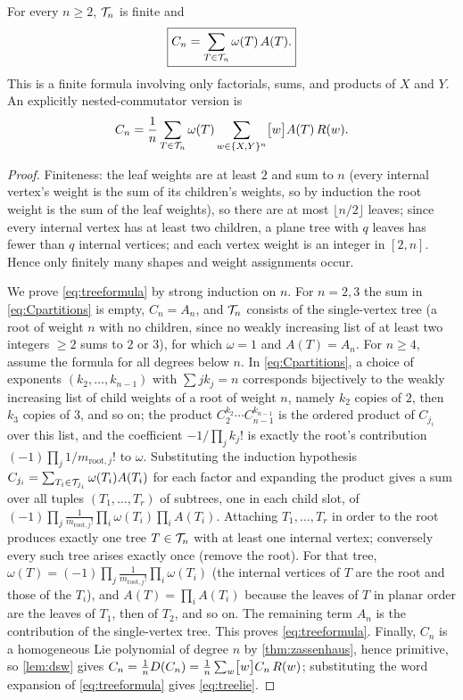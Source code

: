 \begin{theorem}\label{thm:tree}
For every $n\geq2$, $\mathcal{T}_n$ is finite and
\begin{equation}\label{eq:treeformula}
 \boxed{\displaystyle C_n=\sum_{T\in\mathcal{T}_n}\omega(T)\,A(T).}
\end{equation}
This is a finite formula involving only factorials, sums, and products of
$X$ and $Y$. An explicitly nested-commutator version is
\begin{equation}\label{eq:treelie}
 C_n=\frac1n\sum_{T\in\mathcal{T}_n}\omega(T)\sum_{w\in\{X,Y\}^n}\bigl[w\bigr]A(T)\,R(w).
\end{equation}
\end{theorem}
\begin{proof}
Finiteness: the leaf weights are at least $2$ and sum to $n$ (every
internal vertex's weight is the sum of its children's weights, so by
induction the root weight is the sum of the leaf weights), so there are at
most $\lfloor n/2\rfloor$ leaves; since every internal vertex has at least
two children, a plane tree with $q$ leaves has fewer than $q$ internal
vertices; and each vertex weight is an integer in $[2,n]$. Hence only
finitely many shapes and weight assignments occur.

We prove \eqref{eq:treeformula} by strong induction on $n$. For $n=2,3$
the sum in \eqref{eq:Cpartitions} is empty, $C_n=A_n$, and $\mathcal{T}_n$ consists
of the single-vertex tree (a root of weight $n$ with no children, since
no weakly increasing list of at least two integers $\geq2$ sums to $2$ or
$3$), for which $\omega=1$ and $A(T)=A_n$. For $n\geq4$, assume the formula
for all degrees below $n$. In \eqref{eq:Cpartitions}, a choice of exponents
$(k_2,\ldots,k_{n-1})$ with $\sum jk_j=n$ corresponds bijectively to the
weakly increasing list of child weights of a root of weight $n$, namely
$k_2$ copies of $2$, then $k_3$ copies of $3$, and so on; the product
$C_2^{k_2}\cdots C_{n-1}^{k_{n-1}}$ is the ordered product of $C_{j_i}$
over this list, and the coefficient $-1/\prod_jk_j!$ is exactly the root's
contribution $(-1)\prod_j1/m_{\mathrm{root},j}!$ to $\omega$. Substituting
the induction hypothesis $C_{j_i}=\sum_{T_i\in\mathcal{T}_{j_i}}\omega(T_i)A(T_i)$
for each factor and expanding the product gives a sum over all tuples
$(T_1,\ldots,T_r)$ of subtrees, one in each child slot, of
$(-1)\prod_j\frac1{m_{\mathrm{root},j}!}\prod_i\omega(T_i)\prod_iA(T_i)$.
Attaching $T_1,\ldots,T_r$ in order to the root produces exactly one tree
$T\in\mathcal{T}_n$ with at least one internal vertex; conversely every such tree
arises exactly once (remove the root). For that tree,
$\omega(T)=(-1)\prod_j\frac1{m_{\mathrm{root},j}!}\prod_i\omega(T_i)$
(the internal vertices of $T$ are the root and those of the $T_i$), and
$A(T)=\prod_iA(T_i)$ because the leaves of $T$ in planar order are the
leaves of $T_1$, then of $T_2$, and so on. The remaining term $A_n$ is the
contribution of the single-vertex tree. This proves \eqref{eq:treeformula}.
Finally, $C_n$ is a homogeneous Lie polynomial of degree $n$ by
\cref{thm:zassenhaus}, hence primitive, so \cref{lem:dsw} gives
$C_n=\frac1nD(C_n)=\frac1n\sum_w\bigl[w\bigr]C_n\,R(w)$; substituting the word
expansion of \eqref{eq:treeformula} gives \eqref{eq:treelie}.
\end{proof}
